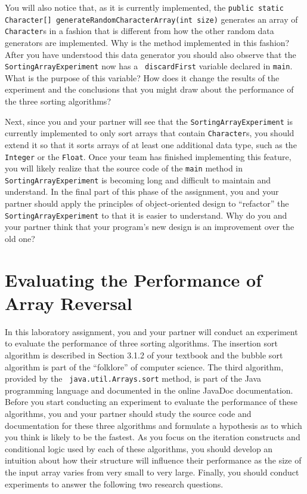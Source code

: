 You will also notice that, as it is currently implemented, the {\tt public static Character[]
generateRandomCharacterArray(int size)} generates an array of {\tt Character}s in a fashion that is different from how
the other random data generators are implemented. Why is the method implemented in this fashion? After you have
understood this data generator you should also observe that the {\tt SortingArrayExperiment} now has a {\tt
discardFirst} variable declared in {\tt main}. What is the purpose of this variable? How does it change the results of
the experiment and the conclusions that you might draw about the performance of the three sorting algorithms?

Next, since you and your partner will see that the {\tt SortingArrayExperiment} is currently implemented to only sort
arrays that contain {\tt Character}s, you should extend it so that it sorts arrays of at least one additional data type,
such as the {\tt Integer} or the {\tt Float}. Once your team has finished implementing this feature, you will likely
realize that the source code of the {\tt main} method in {\tt SortingArrayExperiment} is becoming long and difficult to
maintain and understand. In the final part of this phase of the assignment, you and your partner should apply the
principles of object-oriented design to ``refactor'' the {\tt SortingArrayExperiment} to that it is easier to
understand. Why do you and your partner think that your program's new design is an improvement over the old one?

\section*{Evaluating the Performance of Array Reversal}

In this laboratory assignment, you and your partner will conduct an experiment to evaluate the performance of three
sorting algorithms. The insertion sort algorithm is described in Section 3.1.2 of your textbook and the bubble sort
algorithm is part of the ``folklore'' of computer science. The third algorithm, provided by the {\tt
java.util.Arrays.sort} method, is part of the Java programming language and documented in the online JavaDoc
documentation. Before you start conducting an experiment to evaluate the performance of these algorithms, you and your
partner should study the source code and documentation for these three algorithms and formulate a hypothesis as to which
you think is likely to be the fastest. As you focus on the iteration constructs and conditional logic used by each of
these algorithms, you should develop an intuition about how their structure will influence their performance as the size
of the input array varies from very small to very large. Finally, you should conduct experiments to answer the following
two research questions.

